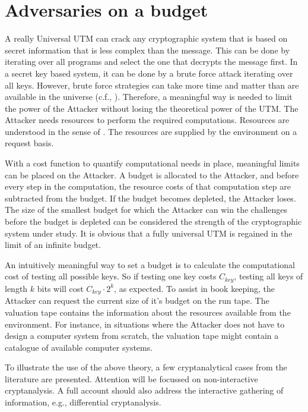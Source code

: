 \documentclass{article}
\begin{document}
\section{Adversaries on a budget}\label{SectBudget}

A really Universal UTM can crack any cryptographic system that is based on
secret information that is less complex than the message. This can be done by
iterating over all programs and select the one that decrypts the message first.
In a secret key based system, it can be done by a brute force attack iterating
over all keys. However, brute force strategies can take more time and matter
than are available in the universe (c.f.,
\cite{SLloyd-2000_Limits,SLloyd02_Capacity,SLloyd05_quant-ph0501135}).
Therefore, a meaningful way is needed to limit the power of the Attacker without
losing the theoretical power of the UTM. The Attacker needs resources to perform
the required computations. Resources are understood in the sense of
\cite{GiorgiJaparidze08012006,Son0911-5262}. The resources are supplied by 
the environment on a request basis.

With a cost function to quantify computational needs in place, meaningful limits
can be placed on the Attacker. A budget is allocated to the Attacker, and before
every step in the computation, the resource costs of that computation step are
subtracted from the budget. If the budget becomes depleted, the Attacker loses.
The size of the smallest budget for which the Attacker can win the challenges
before the budget is depleted can be considered the strength of the
cryptographic system under study. It is obvious that a fully universal UTM is
regained in the limit of an infinite budget.

An intuitively meaningful way to set a budget is to calculate the computational
cost of testing all possible keys. So if testing one key costs $C_{key}$,
testing all keys of length $k$ bits will cost $C_{key} \cdot 2^{k}$, as
expected. To assist in book keeping, the Attacker can request the current size
of it's budget on the run tape. The valuation tape contains the information about
the resources available from the environment. For instance, in situations where
the Attacker does not have to design a computer system from scratch, the
valuation tape might contain a catalogue of available computer systems.

To illustrate the use of the above theory, a few cryptanalytical cases from the
literature are presented. Attention will be focussed on non-interactive
cryptanalysis. A full account should also address the interactive gathering of
information, e.g., differential cryptanalysis.
\end{document}
